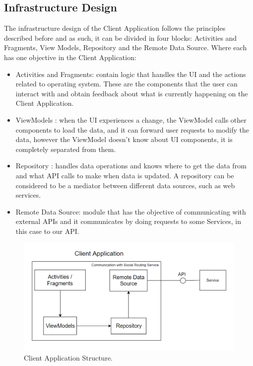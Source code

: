 \documentclass{article}
\begin{document}
        \subsection*{Infrastructure Design}
            The infrastructure design\cite{clientdesignandimplementationdocs} of the Client Application follows the principles described before and as such, it can be divided in four blocks: Activities and Fragments, 
            View Models, Repository and the Remote Data Source. Where each has one objective in the Client Application:
        \begin{itemize}
                \item Activities and Fragments: contain logic that handles the UI and the actions related to operating system. These are the components that 
                the user can interact with and obtain feedback about what is currently happening on the Client Application.
                \item ViewModels : when the UI experiences a change, the ViewModel calls other components to load the data, and it can forward user requests 
                to modify the data, however the ViewModel doesn't know about UI components, it is completely separated from them.
                \item Repository : handles data operations and knows where to get the data from and what API calls to make when data is updated. 
                A repository can be considered to be a mediator between different data sources, such as web services.
                \item Remote Data Source: module that has the objective of communicating with external APIs and it communicates by doing requests to some Services, 
                in this case to our API.
            \end{itemize}
    
        \begin{figure}[h]            
            \includegraphics[width=\textwidth]{images/project-structure/social-routing-client-application-structure.PNG}
            \caption{Client Application Structure.}
            \label{fig:clientapplicationtructure}
        \end{figure}          
    
\end{document}
